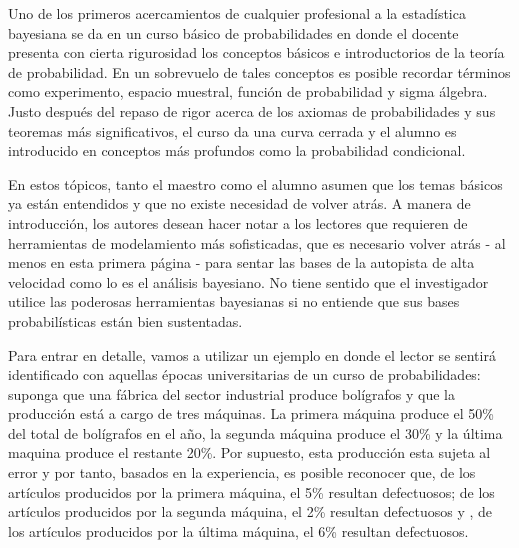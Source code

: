 \begin{Eje}

Uno de los primeros acercamientos de cualquier profesional a la estadística bayesiana se da en un curso básico de probabilidades en donde el docente presenta con cierta rigurosidad los conceptos básicos e introductorios de la teoría de probabilidad. En un sobrevuelo de tales conceptos es posible recordar términos como experimento, espacio muestral, función de probabilidad y sigma álgebra. Justo después del repaso de rigor acerca de los axiomas de probabilidades y sus teoremas más significativos, el curso da una curva cerrada y el alumno es introducido en conceptos más profundos como la probabilidad condicional.

En estos tópicos, tanto el maestro como el alumno asumen que los temas básicos ya están entendidos y que no existe necesidad de volver atrás. A manera de introducción, los autores desean hacer notar a los lectores que requieren de herramientas de modelamiento más sofisticadas, que es necesario volver atrás - al menos en esta primera página - para sentar las bases de la autopista de alta velocidad como lo es el análisis bayesiano. No tiene sentido que el investigador utilice las poderosas herramientas bayesianas si no entiende que sus bases probabilísticas están bien sustentadas.

Para entrar en detalle, vamos a utilizar un ejemplo en donde el lector se sentirá identificado con aquellas épocas universitarias de un curso de probabilidades: suponga que una fábrica del sector industrial produce bolígrafos y que la producción está a cargo de tres máquinas. La primera máquina produce el 50\% del total de bolígrafos en el año, la segunda máquina produce el 30\% y la última maquina produce el restante 20\%. Por supuesto, esta producción esta sujeta al error y por tanto, basados en la experiencia, es posible reconocer que, de los artículos producidos por la primera máquina, el 5\% resultan defectuosos; de los artículos producidos por la segunda máquina, el 2\% resultan defectuosos y , de los artículos producidos por la última máquina, el 6\% resultan defectuosos.


\end{Eje}
